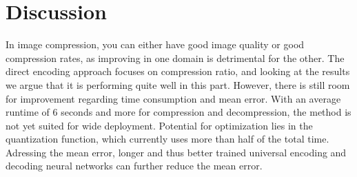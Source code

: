\section{Discussion} \label{sec:discussion}
In image compression, you can either have good image quality or good compression rates, as improving in one domain is detrimental for the other. The direct encoding approach focuses on compression ratio, and looking at the results we argue that it is performing quite well in this part. However, there is still room for improvement regarding time consumption and mean error. With an average runtime of 6 seconds and more for compression and decompression, the method is not yet suited for wide deployment. Potential for optimization lies in the quantization function, which currently uses more than half of the total time. Adressing the mean error, longer and thus better trained universal encoding and decoding neural networks can further reduce the mean error. 




